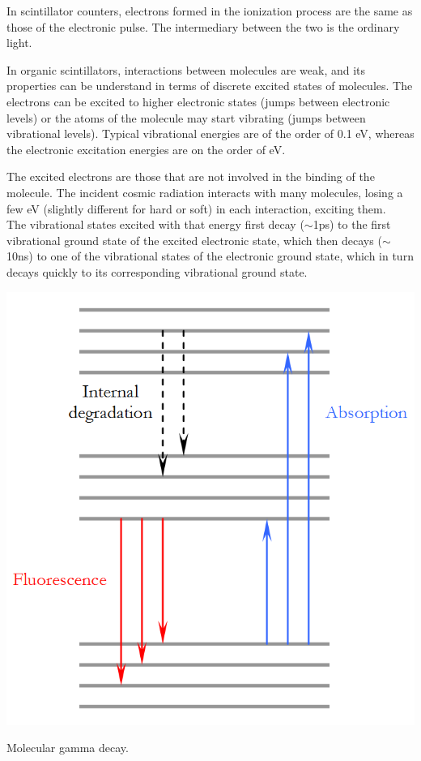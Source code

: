 In scintillator counters, electrons formed in the ionization process are the same as those of the electronic pulse. The intermediary between the two is the ordinary light.

In organic scintillators, interactions between molecules are weak, and its properties can be understand in terms of discrete excited states of molecules. The electrons can be excited to higher electronic states (jumps between electronic levels) or the atoms of the molecule may start vibrating (jumps between vibrational levels). Typical vibrational energies are of the order of 0.1 eV, whereas the electronic excitation energies are on the order of eV.

		\noindent\begin{minipage}{0.5\textwidth} 
			\hspace*{2ex} The excited electrons are those that are not involved in the binding of the molecule. The incident cosmic radiation interacts with many molecules, losing a few eV (slightly different for hard or soft) in each interaction, exciting them.\\

			\hspace*{2ex} The vibrational states excited with that energy first decay ($\sim$1ps) to the first vibrational ground state of the excited electronic state, which then decays ($\sim$10ns) to one of the vibrational states of the electronic ground state, which in turn decays quickly to its corresponding vibrational ground state.
		\end{minipage}
		\begin{minipage}{0.5\textwidth} 
			\bfi[H]
				\bc
					\includegraphics[width=.9\textwidth]{img/scintillator.png}
					\label{fig:molecular}
				\ec
				\caption[Molecular gamma decay.]{Molecular gamma decay.}
			\efi
		\end{minipage}\captionsetup{width=0.8\textwidth}


